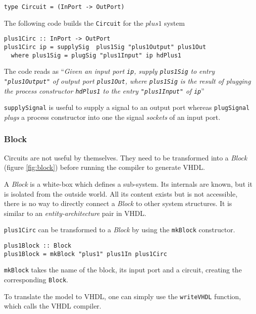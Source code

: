 \begin{lstlisting}
type Circuit = (InPort -> OutPort)
\end{lstlisting}

The following code builds the \texttt{Circuit} for the $\mathit{plus1}$ system

\begin{lstlisting}
plus1Circ :: InPort -> OutPort
plus1Circ ip = supplySig  plus1Sig "plus1Output" plus1Out
  where plus1Sig = plugSig "plus1Input" ip hdPlus1
\end{lstlisting}

The code reads as ``\textit{Given an input port \texttt{ip}, supply
  \texttt{plus1Sig} to entry \texttt{"plus1Output"} of output port
  \texttt{plus1Out}, where \texttt{plus1Sig} is the result of plugging
  the process constructor \texttt{hdPlus1} to the entry
  \texttt{"plus1Input"} of \texttt{ip}}''

\texttt{supplySignal} is useful to supply a signal to an output port
whereas \texttt{plugSignal} \textit{plugs} a process constructor into
one the signal \textit{sockets} of an input port.

\subsubsection{Block}

Circuits are not useful by themselves. They need to be transformed
into a \textit{Block} (figure \ref{fig:block}) before running the compiler to
generate VHDL.

A \textit{Block} is a white-box which defines a sub-system. Its
internals are known, but it is isolated from the outside world. All
its content exists but is not accessible, there is no way to directly
connect a \textit{Block} to other system structures.  It is similar to
an \textit{entity-architecture} pair in VHDL.

\texttt{plus1Circ} can be transformed to a \textit{Block} by using the
\texttt{mkBlock} constructor.
\begin{lstlisting}
plus1Block :: Block
plus1Block = mkBlock "plus1" plus1In plus1Circ
\end{lstlisting}

\texttt{mkBlock} takes the name of the block, its input port and a
circuit, creating the corresponding \texttt{Block}.

To translate the model to VHDL, one can simply use the \texttt{writeVHDL}
function, which calls the VHDL compiler. 

